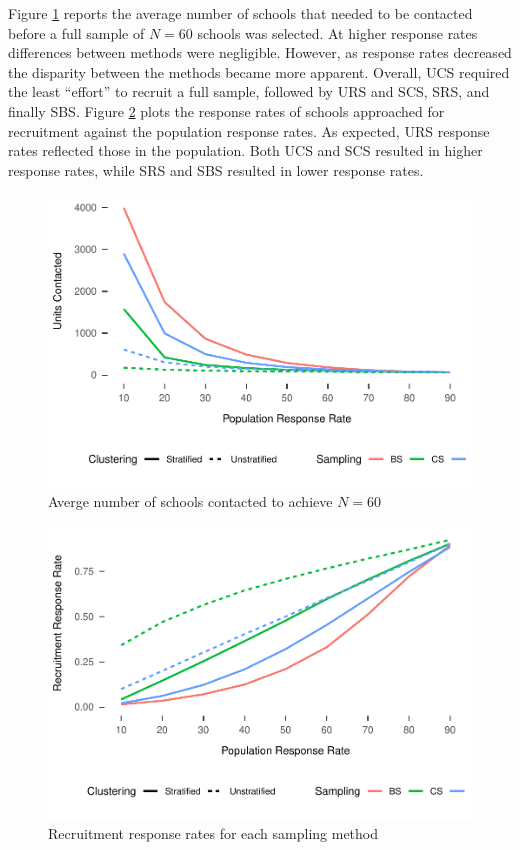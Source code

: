 \documentclass[man,floatsintext]{apa6}
\begin{document}
Figure \ref{fig:fig-units-contacted} reports the average number of schools that needed to be contacted before a full sample of \(N = 60\) schools was selected. At higher response rates differences between methods were negligible. However, as response rates decreased the disparity between the methods became more apparent. Overall, UCS required the least \enquote{effort} to recruit a full sample, followed by URS and SCS, SRS, and finally SBS. Figure \ref{fig:fig-response-rates} plots the response rates of schools approached for recruitment against the population response rates. As expected, URS response rates reflected those in the population. Both UCS and SCS resulted in higher response rates, while SRS and SBS resulted in lower response rates.





\begin{figure}
\centering
\includegraphics{GenSamp-Paper_files/figure-latex/fig-units-contacted-1.pdf}
\caption{\label{fig:fig-units-contacted}Averge number of schools contacted to achieve \(N = 60\)}
\end{figure}



\begin{figure}
\centering
\includegraphics{GenSamp-Paper_files/figure-latex/fig-response-rates-1.pdf}
\caption{\label{fig:fig-response-rates}Recruitment response rates for each sampling method}
\end{figure}
\end{document}
